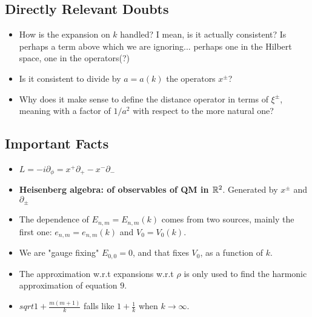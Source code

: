 \documentclass{article}
\begin{document}
\subsection*{Directly Relevant Doubts}

    \begin{itemize}

    \item How is the expansion on $k$ handled? I mean, is it actually consistent? Is perhaps a term above which we are ignoring... perhaps one in the Hilbert space, one in the operators(?)
    
    \item Is it consistent to divide by $a = a(k)$ the operators $x^\pm$? 
    
    \item Why does it make sense to define the distance operator in terms of $\xi^\pm$, meaning with a factor of $1/a^2$ with respect to the more natural one?
    
    \end{itemize}
    
\subsection*{Important Facts}

    \begin{itemize}

    \item $L = - i \partial_\phi = x^+ \partial_+ - x^- \partial_-$
    
    \item \textbf{Heisenberg algebra: of observables of QM in $\mathbb{R}^2$}. Generated by $x^\pm$ and $\partial_\pm$
    
    \item The dependence of $E_{n, m} = E_{n, m}(k)$ comes from two sources, mainly the first one: $e_{n, m} = e_{n, m}(k)$ and $V_0 = V_0(k)$.
    
    \item We are "gauge fixing" $E_{0,0} = 0$, and that fixes $V_0$, as a function of $k$.
    
    \item The approximation w.r.t expansions w.r.t $\rho$ is only used to find the harmonic approximation of equation $9$.
    
    \item $sqrt{ 1 + \frac{m(m+1)}{k} }$ falls like $1 + \frac{1}{k}$ when $k \to \infty$.
    
    \end{itemize}
\end{document}
